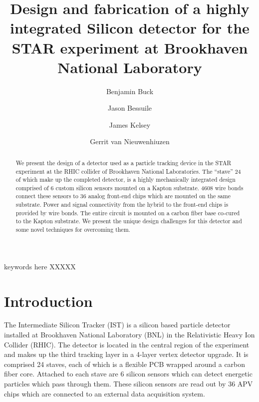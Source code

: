 \documentclass[preprint,12pt]{elsarticle}
\begin{document}
\begin{frontmatter}

\title{Design and fabrication of a highly integrated Silicon detector for the
STAR experiment at Brookhaven National Laboratory}


\author{Benjamin Buck}
\author{Jason Bessuile}
\author{James Kelsey}
\author{Gerrit van Nieuwenhiuzen}

\address{21 Manning Ave, Middleton, Massachusetts}


\begin{abstract}
We present the design of a detector used as a particle tracking device in the
STAR experiment at the RHIC collider of Brookhaven National Laboratories. The
``stave'' 24 of which make up the completed detector, is a highly mechanically
integrated design comprised of 6 custom silicon sensors mounted on a Kapton
substrate. 4608 wire bonds connect these sensors to 36 analog front-end chips
which are mounted on the same substrate. Power and signal connectivity from the
hybrid to the front-end chips is provided by wire bonds. The entire circuit is
mounted on a carbon fiber base co-cured to the Kapton substrate. We present the
unique design challenges for this detector and some novel techniques for
overcoming them.
\end{abstract}

\begin{keyword}
keywords here XXXXX
\end{keyword}

\end{frontmatter}

\section{Introduction}
The Intermediate Silicon Tracker (IST) is a silicon based particle detector
installed at Brookhaven National Laboratory (BNL) in the Relativistic Heavy Ion
Collider (RHIC). The detector is located in the central region of the experiment
and makes up the third tracking layer in a 4-layer vertex detector
upgrade. It is comprised 24 staves, each of which is a flexible PCB wrapped
around a carbon fiber core. Attached to each stave are 6 silicon sensors which
can detect energetic particles which pass through them. These silicon sensors are read
out by 36 APV chips which are connected to an external data acquisition system.
\end{document}
